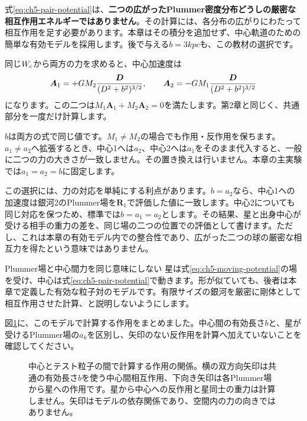 式\eqref{eq:ch5-pair-potential}は、\textbf{二つの広がったPlummer密度分布どうしの厳密な相互作用エネルギーではありません}。その計算には、各分布の広がりにわたって相互作用を足す必要があります。本章はその積分を追加せず、中心軌道のための簡単な有効モデルを採用します。後で与える$b=3\unit{kpc}$も、この教材の選択です。

同じ$W_{\rm c}$から両方の力を求めると、中心加速度は
\begin{equation}
\boldsymbol A_1=+GM_2\frac{\boldsymbol D}{(D^2+b^2)^{3/2}},\qquad
\boldsymbol A_2=-GM_1\frac{\boldsymbol D}{(D^2+b^2)^{3/2}}
\label{eq:ch5-center-acceleration}
\end{equation}
になります。この二つは$M_1\boldsymbol A_1+M_2\boldsymbol A_2=0$を満たします。第2章と同じく、共通部分を一度だけ計算します。

$b$は両方の式で同じ値です。$M_1\ne M_2$の場合でも作用・反作用を保ちます。$a_1\ne a_2$へ拡張するとき、中心1へは$a_2$、中心2へは$a_1$をそのまま代入すると、一般に二つの力の大きさが一致しません。その置き換えは行いません。本章の主実験では$a_1=a_2=b$に固定します。

この選択には、力の対応を単純にする利点があります。$b=a_2$なら、中心1への加速度は銀河2のPlummer場を$\boldsymbol R_1$で評価した値に一致します。中心2についても同じ対応を保つため、標準では$b=a_1=a_2$とします。その結果、星と出身中心が受ける相手の重力の差を、同じ場の二つの位置での評価として書けます。ただし、これは本章の有効モデル内での整合性であり、広がった二つの球の厳密な相互力を得たという意味ではありません。


\begin{failbox}{Plummer場と中心間力を同じ意味にしない}
星は式\eqref{eq:ch5-moving-potential}の場を受け、中心は式\eqref{eq:ch5-pair-potential}で動きます。形が似ていても、後者は本章で定義した有効な粒子対のモデルです。有限サイズの銀河を厳密に剛体として相互作用させた計算、と説明しないようにします。
\end{failbox}


図\ref{fig:concept-ch5-forces}に、このモデルで計算する作用をまとめました。中心間の有効長さ$b$と、星が受けるPlummer場の$a_k$を区別し、矢印のない反作用を計算へ加えていないことを確認してください。
\begin{figure}[!htbp]
\centering

\caption{中心とテスト粒子の間で計算する作用の関係。横の双方向矢印は共通の有効長さ$b$を使う中心間相互作用、下向き矢印は各Plummer場から星への作用です。星から中心への反作用と星同士の重力は計算しません。矢印はモデルの依存関係であり、空間内の力の向きではありません。}
\label{fig:concept-ch5-forces}
\end{figure}

